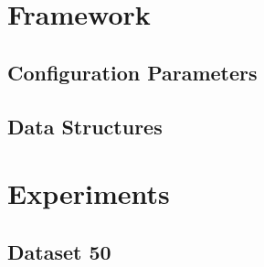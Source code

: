 \chapter{Framework}

\section{Configuration Parameters}



\section{Data Structures}
\label{apx:data_structures}



%

\chapter{Experiments}
\section{Dataset 50}
\label{apx:images50}
